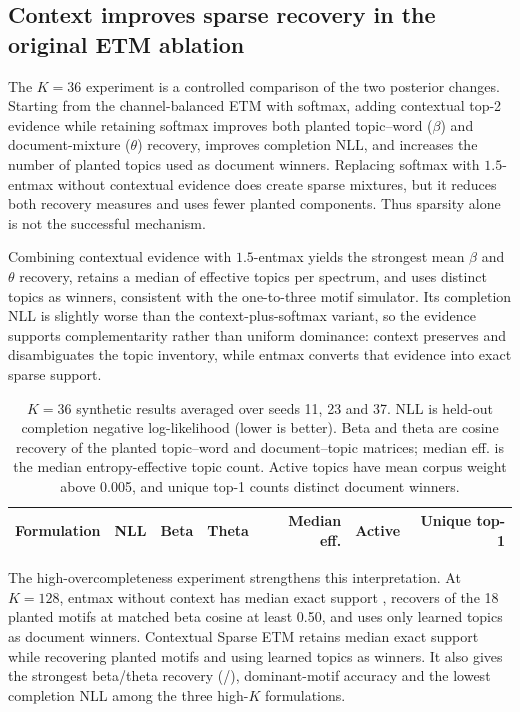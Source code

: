 \documentclass[10pt,a4paper]{article}
\begin{document}
\subsection{Context improves sparse recovery in the original ETM ablation}

The $K=36$ experiment is a controlled comparison of the two posterior changes.
Starting from the channel-balanced ETM with softmax, adding contextual top-2
evidence while retaining softmax improves both planted topic--word ($\beta$) and
document-mixture ($\theta$) recovery, improves completion NLL, and increases the
number of planted topics used as document winners. Replacing softmax with
$1.5$-entmax without contextual evidence does create sparse mixtures, but it
reduces both recovery measures and uses fewer planted components. Thus sparsity
alone is not the successful mechanism.

Combining contextual evidence with $1.5$-entmax yields the strongest mean
$\beta$ and $\theta$ recovery, retains a median of
\SyntheticContextualMedianEffective{} effective topics per spectrum, and uses
\SyntheticContextualUniqueTopOne{} distinct topics as winners, consistent with the
one-to-three motif simulator. Its completion NLL is slightly worse than the
context-plus-softmax variant, so the evidence supports complementarity rather
than uniform dominance: context preserves and disambiguates the topic inventory,
while entmax converts that evidence into exact sparse support.

\begin{table}[H]
\centering
\small
\caption{$K=36$ synthetic results averaged over seeds 11, 23 and 37. NLL is
held-out completion negative log-likelihood (lower is better). Beta and theta
are cosine recovery of the planted topic--word and document--topic matrices;
median eff. is the median entropy-effective topic count. Active topics have
mean corpus weight above 0.005, and unique top-1 counts distinct document
winners.}
\label{tab:synthetic}
\begin{tabular}{@{}lrrrrrr@{}}
\toprule
Formulation & NLL & Beta & Theta & Median eff. & Active & Unique top-1 \\
\midrule

\end{tabular}
\end{table}

The high-overcompleteness experiment strengthens this interpretation. At
$K=128$, entmax without context has median exact support
\HighKEntmaxMedianSupport{}, recovers \HighKEntmaxRecoveredMotifs{} of the 18
planted motifs at matched beta cosine at least 0.50, and uses only
\HighKEntmaxUniqueTopOne{} learned topics as document winners. Contextual Sparse
ETM retains median exact support \HighKContextualMedianSupport{} while recovering
\HighKContextualRecoveredMotifs{} planted motifs and using
\HighKContextualUniqueTopOne{} learned topics as winners. It also gives the
strongest beta/theta recovery
(\HighKContextualBetaRecovery{}/\HighKContextualThetaRecovery{}), dominant-motif
accuracy \HighKContextualDominantAccuracy{} and the lowest completion NLL among
the three high-$K$ formulations.
\end{document}
